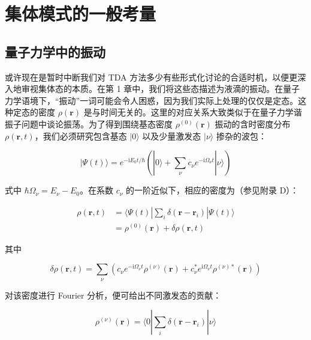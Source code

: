 \section{集体模式的一般考量\label{sec:8.3_=0096C6=004F53=006A21=005F0F=007684=004E00=00822C=008003=0091CF}}

\subsection{量子力学中的振动\label{subsec:8.3.1_=0091CF=005B50=00529B=005B66=004E2D=007684=00632F=0052A8}}

或许现在是暂时中断我们对 TDA 方法多少有些形式化讨论的合适时机，以便更深入地审视集体态的本质。在第 1 章中，我们将这些态描述为液滴的振动。在量子力学语境下，“振动”一词可能会令人困惑，因为我们实际上处理的仅仅是定态。这种定态的密度
$\rho(\boldsymbol{r})$ 是与时间无关的。这里的对应关系大致类似于在量子力学谐振子问题中谈论振荡。为了得到围绕基态密度
$\rho^{(0)}(\boldsymbol{r})$ 振动的含时密度分布 $\rho(\boldsymbol{r},t)$，我们必须研究包含基态
$|0\rangle$ 以及少量激发态 $|\nu\rangle$ 掺杂的波包：

\begin{equation}
|\Psi(t)\rangle=e^{-\mathrm{i}E_{0}t/\hbar}\left(|0\rangle+\sum_{\nu}c_{\nu}e^{-\mathrm{i}\Omega_{\nu}t}|\nu\rangle\right)\label{eq:coll_wavepacket}
\end{equation}

式中 $\hbar\Omega_{\nu}=E_{\nu}-E_{0}$。在系数 $c_{\nu}$ 的一阶近似下，相应的密度为（参见附录
D）：

\begin{align}
\rho(\boldsymbol{r},t) & =\langle\Psi(t)|\sum_{i}\delta(\boldsymbol{r}-\boldsymbol{r}_{i})|\Psi(t)\rangle\nonumber \\
 & =\rho^{(0)}(\boldsymbol{r})+\delta\rho(\boldsymbol{r},t)\label{eq:coll_density_expansion}
\end{align}

其中

\begin{equation}
\delta\rho(\boldsymbol{r},t)=\sum_{\nu}\left(c_{\nu}e^{-\mathrm{i}\Omega_{\nu}t}\rho^{(\nu)}(\boldsymbol{r})+c^{*}_{\nu}e^{\mathrm{i}\Omega_{\nu}t}\rho^{(\nu)*}(\boldsymbol{r})\right)\label{eq:coll_density_variation}
\end{equation}

对该密度进行 Fourier 分析，便可给出不同激发态的贡献：

\begin{equation}
\rho^{(\nu)}(\boldsymbol{r})=\langle0|\sum_{i}\delta(\boldsymbol{r}-\boldsymbol{r}_{i})|\nu\rangle\label{eq:coll_transition_density}
\end{equation}

